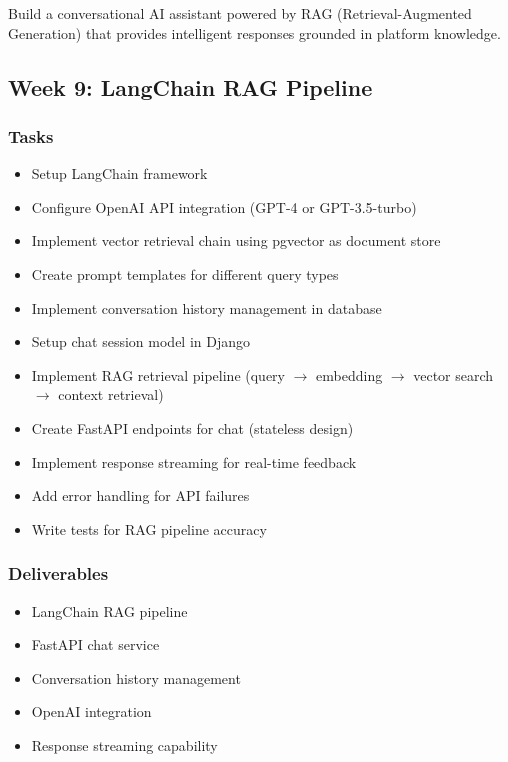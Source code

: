 \documentclass[12pt,oneside]{report}
\begin{document}
Build a conversational AI assistant powered by RAG (Retrieval-Augmented Generation) that provides intelligent responses grounded in platform knowledge.

\subsection{Week 9: LangChain RAG Pipeline}

\subsubsection{Tasks}

\begin{itemize}
    \item Setup LangChain framework
    \item Configure OpenAI API integration (GPT-4 or GPT-3.5-turbo)
    \item Implement vector retrieval chain using pgvector as document store
    \item Create prompt templates for different query types
    \item Implement conversation history management in database
    \item Setup chat session model in Django
    \item Implement RAG retrieval pipeline (query $\rightarrow$ embedding $\rightarrow$ vector search $\rightarrow$ context retrieval)
    \item Create FastAPI endpoints for chat (stateless design)
    \item Implement response streaming for real-time feedback
    \item Add error handling for API failures
    \item Write tests for RAG pipeline accuracy
\end{itemize}

\subsubsection{Deliverables}

\begin{itemize}
    \item LangChain RAG pipeline
    \item FastAPI chat service
    \item Conversation history management
    \item OpenAI integration
    \item Response streaming capability
\end{itemize}
\end{document}
